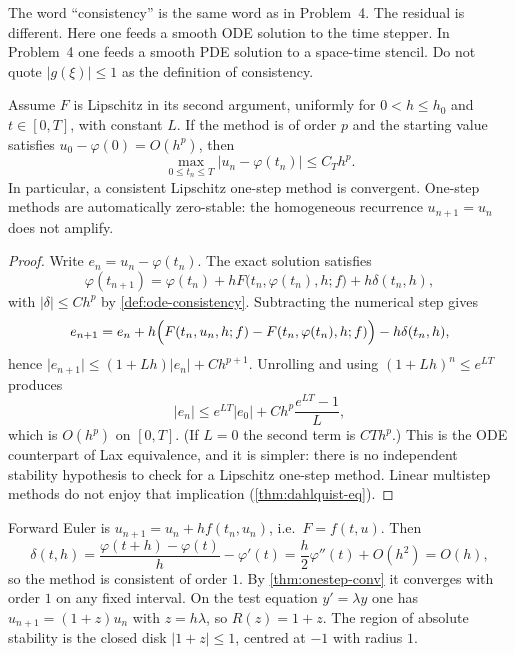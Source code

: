 \documentclass[11pt,a4paper]{article}
\begin{document}
The word ``consistency'' is the same word as in Problem~4. The residual is different. Here one feeds a smooth ODE solution to the time stepper. In Problem~4 one feeds a smooth PDE solution to a space-time stencil. Do not quote \(\lvert g(\xi)\rvert\le 1\) as the definition of consistency.

\begin{theorem}
\label{thm:onestep-conv}
Assume \(F\) is Lipschitz in its second argument, uniformly for \(0<h\le h_{0}\) and \(t\in[0,T]\), with constant \(L\). If the method is of order \(p\) and the starting value satisfies \(u_{0}-\varphi(0)=O(h^{p})\), then
\[
\max_{0\le t_{n}\le T}\lvert u_{n}-\varphi(t_{n})\rvert
\le
C_{T}h^{p}.
\]
In particular, a consistent Lipschitz one-step method is convergent. One-step methods are automatically zero-stable: the homogeneous recurrence \(u_{n+1}=u_{n}\) does not amplify.
\end{theorem}

\begin{proof}
Write \(e_{n}=u_{n}-\varphi(t_{n})\). The exact solution satisfies
\[
\varphi(t_{n+1})
=
\varphi(t_{n})+h F\bigl(t_{n},\varphi(t_{n}),h;f\bigr)+h\delta(t_{n},h),
\]
with \(\lvert\delta\rvert\le C h^{p}\) by \cref{def:ode-consistency}. Subtracting the numerical step gives
\[
e_{n+1}
=
e_{n}+h\Bigl(F(t_{n},u_{n},h;f)-F(t_{n},\varphi(t_{n}),h;f)\Bigr)-h\delta(t_{n},h),
\]
hence \(\lvert e_{n+1}\rvert\le(1+Lh)\lvert e_{n}\rvert+C h^{p+1}\). Unrolling and using \((1+Lh)^{n}\le e^{LT}\) produces
\[
\lvert e_{n}\rvert
\le
e^{LT}\lvert e_{0}\rvert+C h^{p}\frac{e^{LT}-1}{L},
\]
which is \(O(h^{p})\) on \([0,T]\). (If \(L=0\) the second term is \(CTh^{p}\).) This is the ODE counterpart of Lax equivalence, and it is simpler: there is no independent stability hypothesis to check for a Lipschitz one-step method. Linear multistep methods do not enjoy that implication (\cref{thm:dahlquist-eq}).
\end{proof}

\begin{example}
\label{ex:fe-onestep}
Forward Euler is \(u_{n+1}=u_{n}+h f(t_{n},u_{n})\), i.e.\ \(F=f(t,u)\). Then
\[
\delta(t,h)
=
\frac{\varphi(t+h)-\varphi(t)}{h}-\varphi'(t)
=
\frac h2\varphi''(t)+O(h^{2})
=
O(h),
\]
so the method is consistent of order \(1\). By \cref{thm:onestep-conv} it converges with order \(1\) on any fixed interval. On the test equation \(y'=\lambda y\) one has \(u_{n+1}=(1+z)u_{n}\) with \(z=h\lambda\), so \(R(z)=1+z\). The region of absolute stability is the closed disk \(\lvert 1+z\rvert\le 1\), centred at \(-1\) with radius \(1\).
\end{example}
\end{document}
